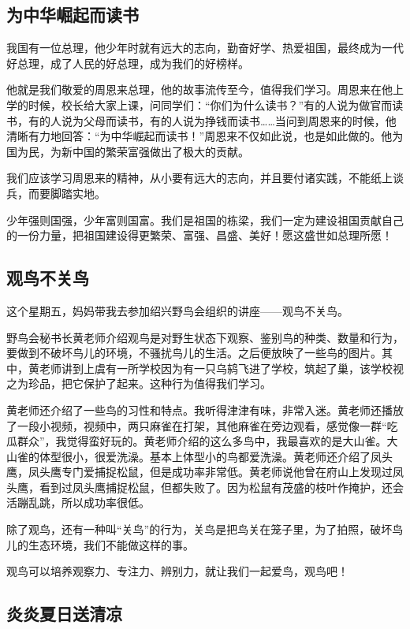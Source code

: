 \documentclass[UTF8,a4paper,titlepage,twoside,10.5pt]{article}
\begin{document}
\subsection{为中华崛起而读书}
\label{sec:org82b6dc0}

我国有一位总理，他少年时就有远大的志向，勤奋好学、热爱祖国，最终成为一代好总理，成了人民的好总理，成为我们的好榜样。

他就是我们敬爱的周恩来总理，他的故事流传至今，值得我们学习。周恩来在他上学的时候，校长给大家上课，问同学们：“你们为什么读书？”有的人说为做官而读书，有的人说为父母而读书，有的人说为挣钱而读书……当问到周恩来的时候，他清晰有力地回答：“为中华崛起而读书！”周恩来不仅如此说，也是如此做的。他为国为民，为新中国的繁荣富强做出了极大的贡献。

我们应该学习周恩来的精神，从小要有远大的志向，并且要付诸实践，不能纸上谈兵，而要脚踏实地。

少年强则国强，少年富则国富。我们是祖国的栋梁，我们一定为建设祖国贡献自己的一份力量，把祖国建设得更繁荣、富强、昌盛、美好！愿这盛世如总理所愿！

\subsection{观鸟不关鸟}
\label{sec:orgc557532}

这个星期五，妈妈带我去参加绍兴野鸟会组织的讲座——观鸟不关鸟。

野鸟会秘书长黄老师介绍观鸟是对野生状态下观察、鉴别鸟的种类、数量和行为，要做到不破坏鸟儿的环境，不骚扰鸟儿的生活。之后便放映了一些鸟的图片。其中，黄老师讲到上虞有一所学校因为有一只乌鸫飞进了学校，筑起了巢，该学校视之为珍品，把它保护了起来。这种行为值得我们学习。

黄老师还介绍了一些鸟的习性和特点。我听得津津有味，非常入迷。黄老师还播放了一段小视频，视频中，两只麻雀在打架，其他麻雀在旁边观看，感觉像一群“吃瓜群众”，我觉得蛮好玩的。黄老师介绍的这么多鸟中，我最喜欢的是大山雀。大山雀的体型很小，很爱洗澡。基本上体型小的鸟都爱洗澡。黄老师还介绍了凤头鹰，凤头鹰专门爱捕捉松鼠，但是成功率非常低。黄老师说他曾在府山上发现过凤头鹰，看到过凤头鹰捕捉松鼠，但都失败了。因为松鼠有茂盛的枝叶作掩护，还会活蹦乱跳，所以成功率很低。

除了观鸟，还有一种叫“关鸟”的行为，关鸟是把鸟关在笼子里，为了拍照，破坏鸟儿的生态环境，我们不能做这样的事。

观鸟可以培养观察力、专注力、辨别力，就让我们一起爱鸟，观鸟吧！

\subsection{炎炎夏日送清凉}
\label{sec:org0dc0755}
\end{document}
